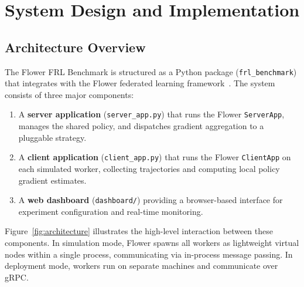 
\chapter{System Design and Implementation}\label{ch:system}

\section{Architecture Overview}

The Flower FRL Benchmark is structured as a Python package (\texttt{frl\_benchmark})
that integrates with the Flower federated learning framework~\cite{beutel2020flower}.
The system consists of three major components:

\begin{enumerate}
    \item A \textbf{server application} (\texttt{server\_app.py}) that runs the
          Flower \texttt{ServerApp}, manages the shared policy, and dispatches
          gradient aggregation to a pluggable strategy.
    \item A \textbf{client application} (\texttt{client\_app.py}) that runs the
          Flower \texttt{ClientApp} on each simulated worker, collecting trajectories
          and computing local policy gradient estimates.
    \item A \textbf{web dashboard} (\texttt{dashboard/}) providing a browser-based
          interface for experiment configuration and real-time monitoring.
\end{enumerate}

Figure~\ref{fig:architecture} illustrates the high-level interaction between these
components. In simulation mode, Flower spawns all workers as lightweight virtual
nodes within a single process, communicating via in-process message passing. In
deployment mode, workers run on separate machines and communicate over gRPC.

